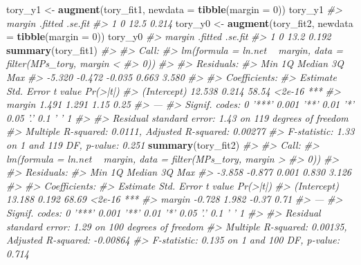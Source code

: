 \documentclass[]{book}
\newenvironment{Shaded}{\begin{snugshade}}{\end{snugshade}}
\newcommand{\CommentTok}[1]{\textcolor[rgb]{0.56,0.35,0.01}{\textit{#1}}}
\newcommand{\DataTypeTok}[1]{\textcolor[rgb]{0.13,0.29,0.53}{#1}}
\newcommand{\DecValTok}[1]{\textcolor[rgb]{0.00,0.00,0.81}{#1}}
\newcommand{\KeywordTok}[1]{\textcolor[rgb]{0.13,0.29,0.53}{\textbf{#1}}}
\newcommand{\NormalTok}[1]{#1}
\newcommand{\StringTok}[1]{\textcolor[rgb]{0.31,0.60,0.02}{#1}}
\theoremstyle{definition}
\theoremstyle{definition}
\theoremstyle{definition}
\theoremstyle{remark}
\begin{document}
\begin{Shaded}
\begin{Highlighting}[]
\NormalTok{tory_y1 <-}\StringTok{ }\KeywordTok{augment}\NormalTok{(tory_fit1, }\DataTypeTok{newdata =} \KeywordTok{tibble}\NormalTok{(}\DataTypeTok{margin =} \DecValTok{0}\NormalTok{))}
\NormalTok{tory_y1}
\CommentTok{#>   margin .fitted .se.fit}
\CommentTok{#> 1      0    12.5   0.214}
\NormalTok{tory_y0 <-}\StringTok{ }\KeywordTok{augment}\NormalTok{(tory_fit2, }\DataTypeTok{newdata =} \KeywordTok{tibble}\NormalTok{(}\DataTypeTok{margin =} \DecValTok{0}\NormalTok{))}
\NormalTok{tory_y0}
\CommentTok{#>   margin .fitted .se.fit}
\CommentTok{#> 1      0    13.2   0.192}
\KeywordTok{summary}\NormalTok{(tory_fit1)}
\CommentTok{#> }
\CommentTok{#> Call:}
\CommentTok{#> lm(formula = ln.net ~ margin, data = filter(MPs_tory, margin < }
\CommentTok{#>     0))}
\CommentTok{#> }
\CommentTok{#> Residuals:}
\CommentTok{#>    Min     1Q Median     3Q    Max }
\CommentTok{#> -5.320 -0.472 -0.035  0.663  3.580 }
\CommentTok{#> }
\CommentTok{#> Coefficients:}
\CommentTok{#>             Estimate Std. Error t value Pr(>|t|)    }
\CommentTok{#> (Intercept)   12.538      0.214   58.54   <2e-16 ***}
\CommentTok{#> margin         1.491      1.291    1.15     0.25    }
\CommentTok{#> ---}
\CommentTok{#> Signif. codes:  0 '***' 0.001 '**' 0.01 '*' 0.05 '.' 0.1 ' ' 1}
\CommentTok{#> }
\CommentTok{#> Residual standard error: 1.43 on 119 degrees of freedom}
\CommentTok{#> Multiple R-squared:  0.0111, Adjusted R-squared:  0.00277 }
\CommentTok{#> F-statistic: 1.33 on 1 and 119 DF,  p-value: 0.251}
\KeywordTok{summary}\NormalTok{(tory_fit2)}
\CommentTok{#> }
\CommentTok{#> Call:}
\CommentTok{#> lm(formula = ln.net ~ margin, data = filter(MPs_tory, margin > }
\CommentTok{#>     0))}
\CommentTok{#> }
\CommentTok{#> Residuals:}
\CommentTok{#>    Min     1Q Median     3Q    Max }
\CommentTok{#> -3.858 -0.877  0.001  0.830  3.126 }
\CommentTok{#> }
\CommentTok{#> Coefficients:}
\CommentTok{#>             Estimate Std. Error t value Pr(>|t|)    }
\CommentTok{#> (Intercept)   13.188      0.192   68.69   <2e-16 ***}
\CommentTok{#> margin        -0.728      1.982   -0.37     0.71    }
\CommentTok{#> ---}
\CommentTok{#> Signif. codes:  0 '***' 0.001 '**' 0.01 '*' 0.05 '.' 0.1 ' ' 1}
\CommentTok{#> }
\CommentTok{#> Residual standard error: 1.29 on 100 degrees of freedom}
\CommentTok{#> Multiple R-squared:  0.00135,    Adjusted R-squared:  -0.00864 }
\CommentTok{#> F-statistic: 0.135 on 1 and 100 DF,  p-value: 0.714}
\end{Highlighting}
\end{Shaded}
\end{document}
